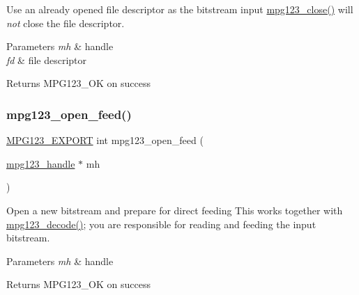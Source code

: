 Use an already opened file descriptor as the bitstream input \mbox{\hyperlink{group__mpg123__input_ga156eb0774196db868485662dc31621af}{mpg123\+\_\+close()}} will {\itshape not} close the file descriptor. 
\begin{DoxyParams}{Parameters}
{\em mh} & handle \\
\hline
{\em fd} & file descriptor \\
\hline
\end{DoxyParams}
\begin{DoxyReturn}{Returns}
M\+P\+G123\+\_\+\+OK on success 
\end{DoxyReturn}
\mbox{\label{group__mpg123__input_ga072669ae9bde29eea8cffa4be10c7345}} 
\subsubsection{\texorpdfstring{mpg123\_open\_feed()}{mpg123\_open\_feed()}}
{\footnotesize\ttfamily \mbox{\hyperlink{mpg123_8h_a2ba98cfba3f760879df70e755b2a61cc}{M\+P\+G123\+\_\+\+E\+X\+P\+O\+RT}} int mpg123\+\_\+open\+\_\+feed (\begin{DoxyParamCaption}\item[{\mbox{\hyperlink{group__mpg123__init_ga6728e2839a395f3a07d4514da659faca}{mpg123\+\_\+handle}} $\ast$}]{mh }\end{DoxyParamCaption})}

Open a new bitstream and prepare for direct feeding This works together with \mbox{\hyperlink{group__mpg123__input_gafaf2382b208257a9685a8cab9f4360be}{mpg123\+\_\+decode()}}; you are responsible for reading and feeding the input bitstream. 
\begin{DoxyParams}{Parameters}
{\em mh} & handle \\
\hline
\end{DoxyParams}
\begin{DoxyReturn}{Returns}
M\+P\+G123\+\_\+\+OK on success 
\end{DoxyReturn}
\mbox{\label{group__mpg123__input_gaadda450ea307f88589cb77ffda0754ab}} 
